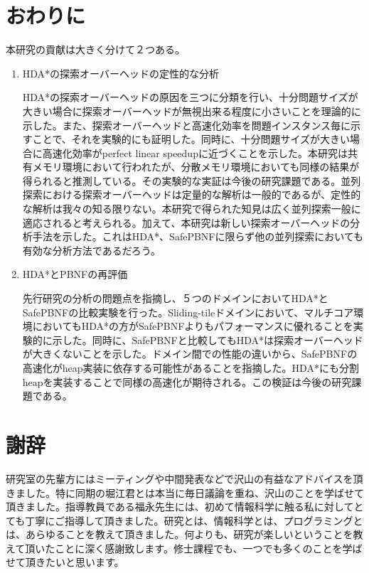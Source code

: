 \documentclass[uplatex]{jsarticle}
\begin{document}
\newpage

\section{おわりに}
\label{sec:conclusion}

本研究の貢献は大きく分けて２つある。

\begin{enumerate}
\item HDA*の探索オーバーヘッドの定性的な分析
\vspace{3mm}

HDA*の探索オーバーヘッドの原因を三つに分類を行い、十分問題サイズが大きい場合に探索オーバーヘッドが無視出来る程度に小さいことを理論的に示した。また、探索オーバーヘッドと高速化効率を問題インスタンス毎に示すことで、それを実験的にも証明した。同時に、十分問題サイズが大きい場合に高速化効率がperfect linear speedupに近づくことを示した。本研究は共有メモリ環境において行われたが、分散メモリ環境においても同様の結果が得られると推測している。その実験的な実証は今後の研究課題である。並列探索における探索オーバーヘッドは定量的な解析は一般的であるが、定性的な解析は我々の知る限りない。本研究で得られた知見は広く並列探索一般に適応されると考えられる。加えて、本研究は新しい探索オーバーヘッドの分析手法を示した。これはHDA*、SafePBNFに限らず他の並列探索においても有効な分析方法であるだろう。
\newline

\item HDA*とPBNFの再評価
\vspace{3mm}

先行研究の分析の問題点を指摘し、５つのドメインにおいてHDA*とSafePBNFの比較実験を行った。Sliding-tileドメインにおいて、マルチコア環境においてもHDA*の方がSafePBNFよりもパフォーマンスに優れることを実験的に示した。同時に、SafePBNFと比較してもHDA*は探索オーバーヘッドが大きくないことを示した。ドメイン間での性能の違いから、SafePBNFの高速化がheap実装に依存する可能性があることを指摘した。HDA*にも分割heapを実装することで同様の高速化が期待される。この検証は今後の研究課題である。

\end{enumerate}


\newpage
\section{謝辞}

研究室の先輩方にはミーティングや中間発表などで沢山の有益なアドバイスを頂きました。特に同期の堀江君とは本当に毎日議論を重ね、沢山のことを学ばせて頂きました。指導教員である福永先生には、初めて情報科学に触る私に対してとても丁寧にご指導して頂きました。研究とは、情報科学とは、プログラミングとは、あらゆることを教えて頂きました。何よりも、研究が楽しいということを教えて頂いたことに深く感謝致します。修士課程でも、一つでも多くのことを学ばせて頂きたいと思います。

\newpage




\newpage

\printindex
\end{document}
